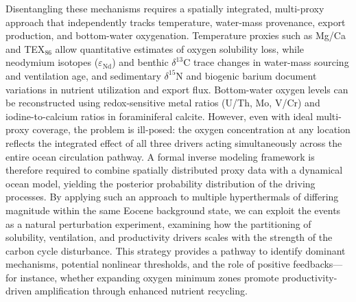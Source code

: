 \documentclass{article}
\begin{document}
Disentangling these mechanisms requires a spatially integrated, multi-proxy approach that independently tracks temperature, water-mass provenance, export production, and bottom-water oxygenation. Temperature proxies such as Mg/Ca and TEX$_{86}$ allow quantitative estimates of oxygen solubility loss, while neodymium isotopes ($\varepsilon_{\text{Nd}}$) and benthic $\delta^{13}$C trace changes in water-mass sourcing and ventilation age, and sedimentary $\delta^{15}$N and biogenic barium document variations in nutrient utilization and export flux. Bottom-water oxygen levels can be reconstructed using redox-sensitive metal ratios (U/Th, Mo, V/Cr) and iodine-to-calcium ratios in foraminiferal calcite. However, even with ideal multi-proxy coverage, the problem is ill-posed: the oxygen concentration at any location reflects the integrated effect of all three drivers acting simultaneously across the entire ocean circulation pathway. A formal inverse modeling framework is therefore required to combine spatially distributed proxy data with a dynamical ocean model, yielding the posterior probability distribution of the driving processes. By applying such an approach to multiple hyperthermals of differing magnitude within the same Eocene background state, we can exploit the events as a natural perturbation experiment, examining how the partitioning of solubility, ventilation, and productivity drivers scales with the strength of the carbon cycle disturbance. This strategy provides a pathway to identify dominant mechanisms, potential nonlinear thresholds, and the role of positive feedbacks---for instance, whether expanding oxygen minimum zones promote productivity-driven amplification through enhanced nutrient recycling.
\end{document}
